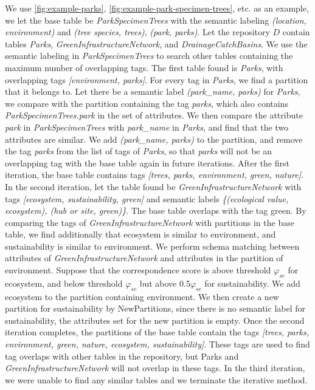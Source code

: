 We use \autoref{fig:example-parks}, \autoref{fig:example-park-specimen-trees}, etc. as an example, we let the base table be \textit{ParkSpecimenTrees} with the semantic labeling \textit{(location, environment)} and \textit{(tree species, trees)}, \textit{(park, parks)}. Let the repository $D$ contain tables \textit{Parks}, \textit{GreenInfrastructureNetwork}, and \textit{DrainageCatchBasins}. We use the semantic labeling in \textit{ParkSpecimenTrees} to search other tables containing the maximum number of overlapping tags. The first table found is \textit{Parks}, with overlapping tags \textit{[environment, parks]}. For every tag in \textit{Parks}, we find a partition that it belongs to. Let there be a semantic label \textit{(park\_name, parks)} for \textit{Parks}, we compare with the partition containing the tag \textit{parks}, which also contains \textit{ParkSpecimenTrees.park} in the set of attributes. We then compare the attribute \textit{park} in \textit{ParkSpecimenTrees} with \textit{park\_name} in \textit{Parks}, and find that the two attributes are similar. We add \textit{(park\_name, parks)} to the partition, and remove the tag \textit{parks} from the list of tags of \textit{Parks}, so that \textit{parks} will not be an overlapping tag with the base table again in future iterations. After the first iteration, the base table contains tags \textit{[trees, parks, environment, green, nature]}. In the second iteration, let the table found be \textit{GreenInfrastructureNetwork} with tags \textit{[ecosystem, sustainability, green]} and semantic labels \textit{\{(ecological value, ecosystem), (hub or site, green)\}}. The base table overlaps with the tag green. By comparing the tags of \textit{GreenInfrastructureNetwork} with partitions in the base table, we find additionally that ecosystem is similar to environment, and sustainability is similar to environment. We perform schema matching between attributes of \textit{GreenInfrastructureNetwork} and attributes in the partition of environment. Suppose that the correspondence score is above threshold $\ensuremath{\varphi}_{sc}$ for ecosystem, and below threshold $\ensuremath{\varphi}_{sc}$ but above 0.5$\ensuremath{\varphi}_{sc}$ for sustainability. We add ecosystem to the partition containing environment. We then create a new partition for sustainability by NewPartitions, since there is no semantic label for sustainability, the attributes set for the new partition is empty. Once the second iteration completes, the partitions of the base table contain the tags \textit{[trees, parks, environment, green, nature, ecosystem, sustainability]}. These tags are used to find tag overlaps with other tables in the repository, but Parks and \textit{GreenInfrastructureNetwork} will not overlap in these tags. In the third iteration, we were unable to find any similar tables and we terminate the iterative method.

